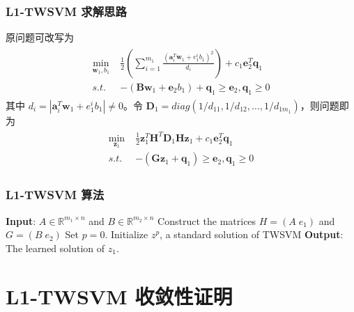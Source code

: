 \documentclass{beamer}
\begin{document}
\begin{frame}
\frametitle{L1-TWSVM 求解思路}
原问题可改写为
\begin{align}
\begin{split}
\label{ts5}
    \min\limits_{\mathbf{w}_1,b_1} \;& \frac{1}{2}(\sum_{i=1}^{m_1}\frac{(\mathbf{a}_i^T\mathbf{w}_1+e_1^ib_1)^2}{d_i})+c_1\mathbf{e}_2^T\mathbf{q}_1  \\
    s.t.\;& -(\mathbf{Bw}_1+\mathbf{e}_2b_1)+\mathbf{q}_1 \geq \mathbf{e}_2,\mathbf{q}_1\geq 0
\end{split}
\end{align}
其中 $d_i=|\mathbf{a}_i^T\mathbf{w}_1+e_1^ib_1|\ne 0$。令 $\mathbf{D}_1=diag(1/d_{11},1/d_{12},\ldots,1/d_{1m_1})$，则问题即为
\begin{align}
\begin{split}
\label{ts8}
    \min\limits_{\mathbf{z}_1} \;& \frac{1}{2}\mathbf{z}_1^T\mathbf{H}^T\mathbf{D}_1\mathbf{Hz}_1+c_1\mathbf{e}_2^T\mathbf{q}_1 \\
    s.t.\;& -(\mathbf{Gz}_1+\mathbf{q}_1) \geq \mathbf{e}_2,\mathbf{q}_1\geq 0
\end{split}
\end{align}
\end{frame}

\begin{frame}
\frametitle{L1-TWSVM 算法}
\begin{algorithm}[H]
 \textbf{Input}: $A \in \mathbb{R}^{m_1 \times n}$ and $B \in \mathbb{R}^{m_2 \times n}$\;
 Construct the matrices $H = (A\; e_1)$ and $G = (B\; e_2)$\;
 Set $p = 0$. Initialize $z^p$, a standard solution of TWSVM\;
 \textbf{Output}: The learned solution of $z_1$.
\end{algorithm}
\end{frame}


\section{L1-TWSVM 收敛性证明}
\end{document}
